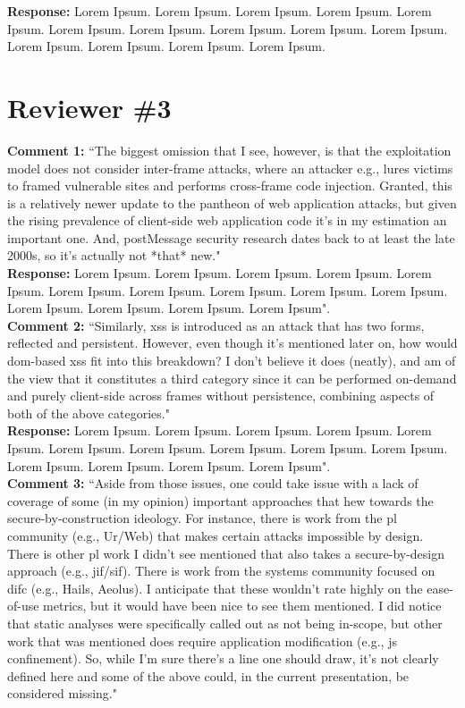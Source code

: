 \documentclass[10pt,journal,compsoc]{IEEEtran}
\begin{document}
\noindent
{\bf Response:}
Lorem Ipsum. Lorem Ipsum. Lorem Ipsum. Lorem Ipsum.
Lorem Ipsum. Lorem Ipsum. Lorem Ipsum. Lorem Ipsum.
Lorem Ipsum. Lorem Ipsum. Lorem Ipsum. Lorem Ipsum.
Lorem Ipsum. Lorem Ipsum.\\

\section{Reviewer \#3}
\label{sec:r3}

{\bf Comment 1:} ``The biggest omission that I see,
however,
is that the exploitation model does not consider
inter-frame attacks, where an attacker
e.g., lures victims to framed vulnerable
sites and performs cross-frame code
injection.  Granted, this is a relatively
newer update to the pantheon of
web application attacks, but given the rising
prevalence of client-side
web application code it's in my
estimation an important one. 
And,
postMessage
security research dates back to at least the late 2000s,
so it's actually not *that* new."\\

\noindent
{\bf Response:}
Lorem Ipsum. Lorem Ipsum. Lorem Ipsum. Lorem Ipsum.
Lorem Ipsum. Lorem Ipsum. Lorem Ipsum. Lorem Ipsum.
Lorem Ipsum. Lorem Ipsum. Lorem Ipsum. Lorem Ipsum.
Lorem Ipsum. Lorem Ipsum".\\

\noindent
{\bf Comment 2:} ``Similarly, {\sc xss} is introduced
as an attack that has two forms,
reflected and persistent.
However,
even though it's mentioned later on,
how would {\sc dom}-based {\sc xss} fit into this breakdown?
I don't believe it does (neatly),
and am of the view that it constitutes a third
category since it can be performed on-demand
and purely client-side across frames without persistence,
combining aspects of both of the above categories."\\

\noindent
{\bf Response:}
Lorem Ipsum. Lorem Ipsum. Lorem Ipsum. Lorem Ipsum.
Lorem Ipsum. Lorem Ipsum. Lorem Ipsum. Lorem Ipsum.
Lorem Ipsum. Lorem Ipsum. Lorem Ipsum. Lorem Ipsum.
Lorem Ipsum. Lorem Ipsum".\\

\noindent
{\bf Comment 3:} ``Aside from those issues,
one could take issue with a lack of coverage of some
(in my opinion) important approaches that hew towards the
secure-by-construction ideology.
For instance,
there is work from the {\sc pl} community (e.g., Ur/Web)
that makes certain attacks impossible by design.
There is other {\sc pl} work I didn't
see mentioned that also takes a
secure-by-design approach (e.g., {\sc jif}/{\sc sif}).
There is work from the systems
community focused on {\sc difc} (e.g., Hails, Aeolus).
I anticipate that these
wouldn't rate highly on the ease-of-use metrics,
but it would have been nice to see them mentioned.
I did notice that static analyses were specifically
called out as not being in-scope,
but other work that was mentioned does
require application modification (e.g., {\sc js} confinement).
So, while I'm sure there's a line one should draw,
it's not clearly defined here and some of the
above could, in the current presentation,
be considered missing."\\
\end{document}
